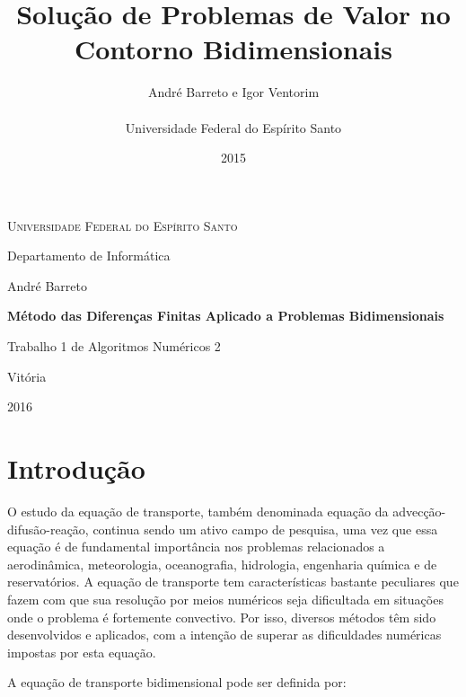 \documentclass[
	11pt,				%
	oneside,			%
	a4paper,			%
	english,			%
	brazil,				%
	]{article}
\title{\textbf{Solução de Problemas de Valor no Contorno Bidimensionais}}
\author{
André Barreto e Igor Ventorim\\\\
\normalsize Universidade Federal do Espírito Santo\\
}
\date{2015}
\begin{document}


\frenchspacing

\graphicspath{ {Imagens/} }

\begin{titlepage}
	\centering
	{\scshape \large Universidade Federal do Espírito Santo\par}
	{\large Departamento de Informática\par}
	\vspace{1cm}
	{\large André Barreto\par}
	
	\vfill
	
	{\LARGE \bfseries Método das Diferenças Finitas Aplicado a
Problemas Bidimensionais\par}
	\vspace{1cm}
	{\large Trabalho 1 de Algoritmos Numéricos 2\par}

	\vfill

	{\large Vitória\par}
	{\large 2016\par}
\end{titlepage}
\addtocounter{page}{1}

\section{Introdução}
O estudo da equação de transporte, também denominada equação
da advecção-difusão-reação, continua sendo um ativo campo de
pesquisa, uma vez que essa equação é de fundamental
importância nos problemas relacionados a aerodinâmica, 
meteorologia, oceanografia, hidrologia, engenharia química e
de reservatórios. A equação de transporte tem
características bastante peculiares que fazem com que sua 
resolução por meios numéricos seja dificultada em situações
onde o problema é fortemente convectivo. Por isso, diversos
métodos têm sido desenvolvidos e aplicados, com a intenção
de superar as dificuldades numéricas impostas por esta
equação.

A equação de transporte bidimensional pode ser definida por:
\end{document}
